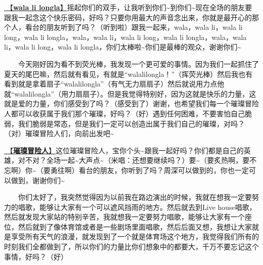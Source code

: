 \documentclass[]{ctexbook}
\begin{document}
\hyperref[wala-li-longla]{🎵【\textbf{wala li longla}】}摇起你们的双手，让我听到你们\textasciitilde 到你们\textasciitilde 现在全场的朋友要跟我一起念这个快乐密码，好吗？只要你用最大的声音念出来，你就是最开心的那个人，看台的朋友听到了吗？（听到啦）跟我一起来，wala，wala li，wala li long，wala li longla，wala，wala li，wala li long，wala li longla，wala，wala li，wala li long，wala li longla，你们太棒啦\textasciitilde 你们是最棒的观众，谢谢你们\textasciitilde{}

  今天刚好因为看不到荧光棒，我发现一个更可爱的事情。因为我们一起抓住了夏天的尾巴嘛，然后就有看见，有就是``walalilongla！''（挥荧光棒）然后我也有看到就是拿着扇子``walalilongla''（有气无力扇扇子）然后就说用力点他就``walalilongla''（用力扇扇子）。但是我觉得特别好，因为这就是快乐的力量，这就是爱的力量，你们感受到了吗？（感受到了）谢谢，也希望我们每一个璀璨冒险人都可以收获属于我们那个璀璨，好吗？（好）遇到任何困难，不要害怕自己脆弱，我们脆弱是常态，但是我们一定可以创造出属于我们自己的璀璨，对吗？（对）璀璨冒险人们，向前出发吧\textasciitilde{}

\hyperref[adventurers]{🎵【\textbf{璀璨冒险人}】}这位璀璨冒险人，宝你个头\textasciitilde 跟我一起好吗？你们都是自己的英雄，对不对？全场一起\textasciitilde 大声点\textasciitilde（米唱：还想要继续吗？）要\textasciitilde（要炙热啊，要不忘啊）你\textasciitilde（要勇往啊）看台的朋友，你听到了吗？周深可以做到的，你也一定可以做到，谢谢你们\textasciitilde{}

  你们太好了，我突然觉得因为以前我在路边演出的时候，我就在想我一定要努力的唱歌，能够让大家有一个可以遮风挡雨的地方。然后就去到Live house唱歌，然后就发现大家站的特别辛苦，我就想我一定要努力唱歌，能够让大家有一个座位，然后就到了像体育馆或者是一些剧场里面唱歌，然后后面又想，我想让大家就是享受所有天气的浪漫，就发现到了一个就是体育场这个地方，我觉得我们所有的时刻我们全都做到了，所以你们的力量比你们想象中的都要大，千万不要忘记这个事情，好吗？（好）
\end{document}
